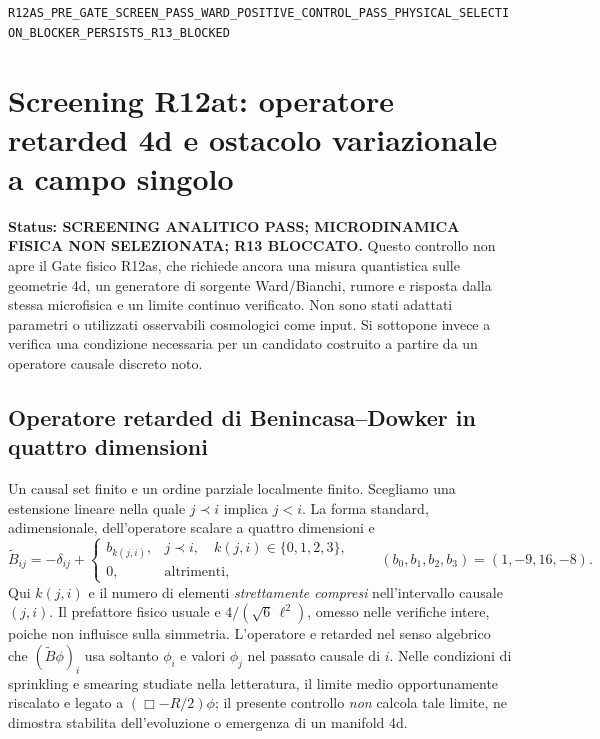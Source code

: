 \documentclass[11pt,a4paper]{article}
\newcommand{\status}[1]{\textsf{#1}}
\begin{document}
\begin{center}\small
\nolinkurl{R12AS_PRE_GATE_SCREEN_PASS_WARD_POSITIVE_CONTROL_PASS_PHYSICAL_SELECTION_BLOCKER_PERSISTS_R13_BLOCKED}
\end{center}

\section{Screening R12at: operatore retarded 4d e ostacolo variazionale a campo singolo}
\label{sec:r12at-screen}

\textbf{Status: \status{SCREENING ANALITICO PASS; MICRODINAMICA FISICA NON SELEZIONATA; R13 BLOCCATO}.}
Questo controllo non apre il Gate fisico R12as, che richiede ancora una misura quantistica
sulle geometrie 4d, un generatore di sorgente Ward/Bianchi, rumore e risposta dalla stessa
microfisica e un limite continuo verificato. Non sono stati adattati parametri o utilizzati
osservabili cosmologici come input. Si sottopone invece a verifica una condizione necessaria
per un candidato costruito a partire da un operatore causale discreto noto.

\subsection{Operatore retarded di Benincasa--Dowker in quattro dimensioni}
Un causal set finito e un ordine parziale localmente finito. Scegliamo una estensione lineare
nella quale $j\prec i$ implica $j<i$. La forma standard, adimensionale, dell'operatore
scalare a quattro dimensioni \cite{Surya2019Review,BenincasaDowker2010} e
\begin{equation}
 \widetilde B_{ij}=-\delta_{ij}+
 \begin{cases}
  b_{k(j,i)}, & j\prec i,\quad k(j,i)\in\{0,1,2,3\},\\
  0, & \text{altrimenti},
 \end{cases}
 \qquad (b_0,b_1,b_2,b_3)=(1,-9,16,-8).
 \label{eq:r12at_B}
\end{equation}
Qui $k(j,i)$ e il numero di elementi \emph{strettamente compresi} nell'intervallo causale
$(j,i)$. Il prefattore fisico usuale e $4/(\sqrt6\,\ell^2)$, omesso nelle verifiche intere,
poiche non influisce sulla simmetria. L'operatore e retarded nel senso algebrico che
$(\widetilde B\phi)_i$ usa soltanto $\phi_i$ e valori $\phi_j$ nel passato causale di $i$.
Nelle condizioni di sprinkling e smearing studiate nella letteratura, il limite medio
opportunamente riscalato e legato a $(\Box-R/2)\phi$; il presente controllo \emph{non}
calcola tale limite, ne dimostra stabilita dell'evoluzione o emergenza di un manifold 4d.
\end{document}
